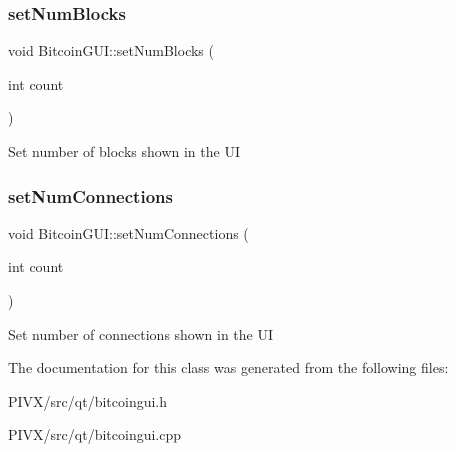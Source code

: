 \subsubsection{\texorpdfstring{set\+Num\+Blocks}{setNumBlocks}}
{\footnotesize\ttfamily void Bitcoin\+G\+U\+I\+::set\+Num\+Blocks (\begin{DoxyParamCaption}\item[{int}]{count }\end{DoxyParamCaption})\hspace{0.3cm}{\ttfamily [slot]}}

Set number of blocks shown in the UI \mbox{\label{class_bitcoin_g_u_i_ae5b9dc62c6a52764a92cfacbe128626f}} 
\subsubsection{\texorpdfstring{set\+Num\+Connections}{setNumConnections}}
{\footnotesize\ttfamily void Bitcoin\+G\+U\+I\+::set\+Num\+Connections (\begin{DoxyParamCaption}\item[{int}]{count }\end{DoxyParamCaption})\hspace{0.3cm}{\ttfamily [slot]}}

Set number of connections shown in the UI 

The documentation for this class was generated from the following files\+:\begin{DoxyCompactItemize}
\item 
P\+I\+V\+X/src/qt/bitcoingui.\+h\item 
P\+I\+V\+X/src/qt/bitcoingui.\+cpp\end{DoxyCompactItemize}
